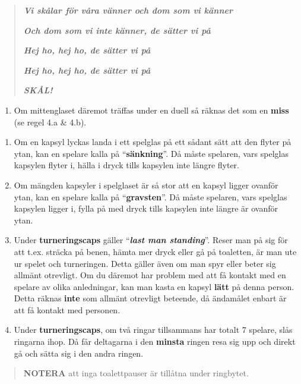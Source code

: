 \begin{quote}
\emph{\textbf{Vi skålar för våra vänner och dom som vi känner}}

\emph{\textbf{Och dom som vi inte känner, de sätter vi på}}

\emph{\textbf{Hej ho, hej ho, de sätter vi på}}

\emph{\textbf{Hej ho, hej ho, de sätter vi på}}

\textbf{\emph{SKÅL!}}
\end{quote}

\begin{enumerate}
\def\labelenumi{\alph{enumi}.}
\item
  Om mittenglaset däremot träffas under en duell så räknas det som en
  \textbf{miss} (se regel 4.a \& 4.b).
\end{enumerate}

\begin{enumerate}
\def\labelenumi{\arabic{enumi}.}
\setcounter{enumi}{5}
\item
  Om en kapsyl lyckas landa i ett spelglas på ett sådant sätt att den
  flyter på ytan, kan en spelare kalla på ``\textbf{sänkning}''. Då
  måste spelaren, vars spelglas kapsylen flyter i, hälla i dryck tills
  kapsylen inte längre flyter.
\item
  Om mängden kapsyler i spelglaset är så stor att en kapsyl ligger
  ovanför ytan, kan en spelare kalla på ``\textbf{gravsten}''. Då måste
  spelaren, vars spelglas kapsylen ligger i, fylla på med dryck tills
  kapsylen inte längre är ovanför ytan.
\item
  Under \textbf{turneringscaps} gäller ``\emph{\textbf{last man
  standing}}''. Reser man på sig för att t.ex. sträcka på benen, hämta
  mer dryck eller gå på toaletten, är man ute ur spelet och turneringen.
  Detta gäller även om man spyr eller beter sig allmänt otrevligt. Om du
  däremot har problem med att få kontakt med en spelare av olika
  anledningar, kan man kasta en kapsyl \textbf{lätt} på denna person.
  Detta räknas \textbf{inte} som allmänt otrevligt beteende, då
  ändamålet enbart är att få kontakt med personen.
\item
  Under \textbf{turneringscaps}, om två ringar tillsammans har totalt 7
  spelare, slås ringarna ihop. Då får deltagarna i den \textbf{minsta}
  ringen resa sig upp och direkt gå och sätta sig i den andra ringen.
\end{enumerate}

\begin{quote}
\textbf{NOTERA} att inga toalettpauser är tillåtna under ringbytet.
\end{quote}

